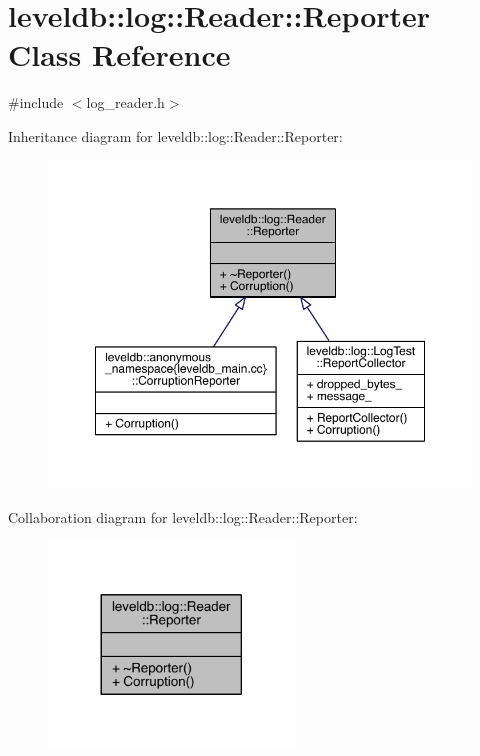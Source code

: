 \hypertarget{classleveldb_1_1log_1_1_reader_1_1_reporter}{}\section{leveldb\+:\+:log\+:\+:Reader\+:\+:Reporter Class Reference}
\label{classleveldb_1_1log_1_1_reader_1_1_reporter}


{\ttfamily \#include $<$log\+\_\+reader.\+h$>$}



Inheritance diagram for leveldb\+:\+:log\+:\+:Reader\+:\+:Reporter\+:
\nopagebreak
\begin{figure}[H]
\begin{center}
\leavevmode
\includegraphics[width=350pt]{classleveldb_1_1log_1_1_reader_1_1_reporter__inherit__graph}
\end{center}
\end{figure}


Collaboration diagram for leveldb\+:\+:log\+:\+:Reader\+:\+:Reporter\+:\nopagebreak
\begin{figure}[H]
\begin{center}
\leavevmode
\includegraphics[width=185pt]{classleveldb_1_1log_1_1_reader_1_1_reporter__coll__graph}
\end{center}
\end{figure}
